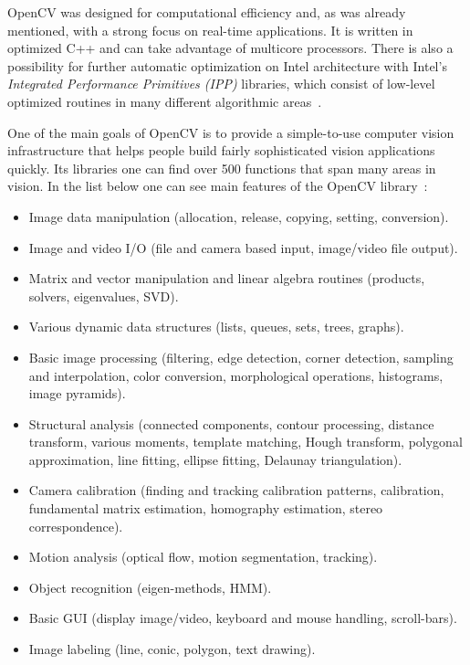 OpenCV was designed for computational efficiency and, as was already mentioned, with a strong focus on real-time applications. It is written in optimized C++ and can take advantage of multicore processors. There is also a possibility for further automatic optimization on Intel architecture with Intel's \textit{Integrated Performance Primitives (IPP)} libraries, which consist of low-level optimized routines in many different algorithmic areas~\cite{kaehler2016learning}.

One of the main goals of OpenCV is to provide a simple-to-use computer vision infrastructure that helps people build fairly sophisticated vision applications quickly. Its libraries one can find over 500 functions that span many areas in vision. In the list below one can see main features of the OpenCV library~\cite{Illinois_openCV}:
\begin{itemize}
\setlength\itemsep{-0.5em}
\item Image data manipulation (allocation, release, copying, setting, conversion).
\item Image and video I/O (file and camera based input, image/video file output).
\item Matrix and vector manipulation and linear algebra routines (products, solvers, eigenvalues, SVD).
\item Various dynamic data structures (lists, queues, sets, trees, graphs).
\item Basic image processing (filtering, edge detection, corner detection, sampling and interpolation, color conversion, morphological operations, histograms, image pyramids).
\item Structural analysis (connected components, contour processing, distance transform, various moments, template matching, Hough transform, polygonal approximation, line fitting, ellipse fitting, Delaunay triangulation).
\item Camera calibration (finding and tracking calibration patterns, calibration, fundamental matrix estimation, homography estimation, stereo correspondence).
\item Motion analysis (optical flow, motion segmentation, tracking).
\item Object recognition (eigen-methods, HMM).
\item Basic GUI (display image/video, keyboard and mouse handling, scroll-bars).
\item Image labeling (line, conic, polygon, text drawing).
\end{itemize}

